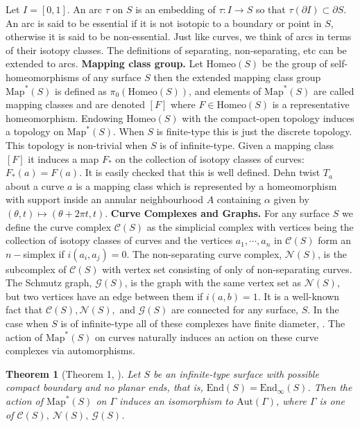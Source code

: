 \documentclass[11pt]{article}
\def\a{\alpha}
\def\map{\text{Map}}
\def\Aut{\text{Aut}}
\def\End{\text{End}}
\newtheorem{theorem}{Theorem}[section]
\begin{document}
Let $I = [0,1]$. An arc $\tau$ on $S$ is an embedding of $\tau:I\to S$ so that $\tau(\partial I) \subset \partial S$. An arc is said to be essential if it is not isotopic to a boundary or point in $S$, otherwise it is said to be non-essential. Just like curves, we think of arcs in terms of their isotopy classes. The definitions of separating, non-separating, etc can be extended to arcs.
\vspace{1em}
\newline
\textbf{Mapping class group.} Let $\text{Homeo}(S)$ be the group of self-homeomorphisms of any surface $S$ then the extended mapping class group $\map^*(S)$ is defined as $\pi_0(\text{Homeo}(S))$, and elements of $\map^*(S)$ are called mapping classes and are denoted $[F]$ where $F\in \text{Homeo}(S)$ is a representative homeomorphism. Endowing $\text{Homeo}(S)$ with the compact-open topology induces a topology on $\map^*(S)$. When $S$ is finite-type this is just the discrete topology. This topology is non-trivial when $S$ is of infinite-type. Given a mapping class $[F]$ it induces a map $F_*$ on the collection of isotopy classes of curves: $F_*(a) = F(a)$. It is easily checked that this is well defined. Dehn twist $T_a$ about a curve $a$ is a mapping class which is represented by a homeomorphism with support inside an annular neighbourhood $A$ containing $\a$ given by $(\theta, t)\mapsto (\theta+2\pi t, t)$.
\vspace{1em}
\newline
\textbf{Curve Complexes and Graphs.} For any surface $S$ we define the curve complex $ \mathcal{C}(S)$ as the simplicial complex with vertices being the collection of isotopy classes of curves and the vertices $a_1,\cdots, a_n$ in $ \mathcal{C}(S)$ form an $n-$simplex if $i(a_i,a_j)=0$. The non-separating curve complex, $ \mathcal{N}(S)$, is the subcomplex of $ \mathcal{C}(S)$ with vertex set consisting of only of non-separating curves. The Schmutz graph, $ \mathcal{G}(S)$, is the graph with the same vertex set as $ \mathcal{N}(S)$, but two vertices have an edge between them if $i(a,b)=1$. It is a well-known fact that $ \mathcal{C}(S), \mathcal{N}(S),$ and $ \mathcal{G}(S)$ are connected for any surface, $S$. In the case when $S$ is of infinite-type all of these complexes have finite diameter, \cite{hernandez}. The action of $\map^*(S)$ on curves naturally induces an action on these curve complexes via automorphisms.
\begin{theorem}[Theorem 1, \cite{hernandez}]\label{thm:her}
 Let $S$ be an infinite-type surface with possible compact boundary and no planar ends, that is, $\End(S) = \End_\infty(S)$. Then the action of $\map^*(S)$ on $\Gamma$ induces an isomorphism to $\Aut(\Gamma)$, where $\Gamma$ is one of $ \mathcal{C}(S),\ \mathcal{N}(S),\ \mathcal{G}(S)$.
\end{theorem}
\end{document}
